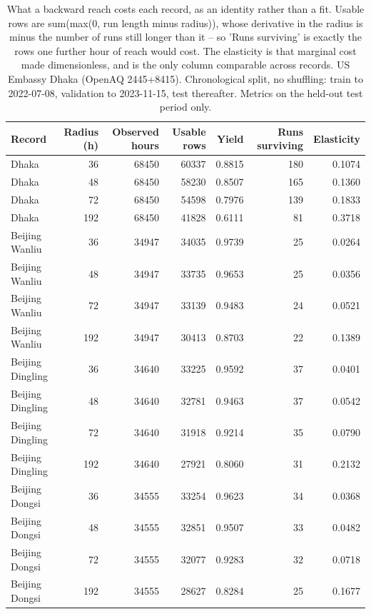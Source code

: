\begin{table}[htbp]
\caption{What a backward reach costs each record, as an identity rather than a fit. Usable rows are sum(max(0, run length minus radius)), whose derivative in the radius is minus the number of runs still longer than it -- so 'Runs surviving' is exactly the rows one further hour of reach would cost. The elasticity is that marginal cost made dimensionless, and is the only column comparable across records. US Embassy Dhaka (OpenAQ 2445+8415). Chronological split, no shuffling: train to 2022-07-08, validation to 2023-11-15, test thereafter. Metrics on the held-out test period only.}
\label{tab:decision_rule}
\begin{tabular}{lrrrrrr}
\toprule
Record & Radius (h) & Observed hours & Usable rows & Yield & Runs surviving & Elasticity \\
\midrule
Dhaka & 36 & 68450 & 60337 & 0.8815 & 180 & 0.1074 \\
Dhaka & 48 & 68450 & 58230 & 0.8507 & 165 & 0.1360 \\
Dhaka & 72 & 68450 & 54598 & 0.7976 & 139 & 0.1833 \\
Dhaka & 192 & 68450 & 41828 & 0.6111 & 81 & 0.3718 \\
Beijing Wanliu & 36 & 34947 & 34035 & 0.9739 & 25 & 0.0264 \\
Beijing Wanliu & 48 & 34947 & 33735 & 0.9653 & 25 & 0.0356 \\
Beijing Wanliu & 72 & 34947 & 33139 & 0.9483 & 24 & 0.0521 \\
Beijing Wanliu & 192 & 34947 & 30413 & 0.8703 & 22 & 0.1389 \\
Beijing Dingling & 36 & 34640 & 33225 & 0.9592 & 37 & 0.0401 \\
Beijing Dingling & 48 & 34640 & 32781 & 0.9463 & 37 & 0.0542 \\
Beijing Dingling & 72 & 34640 & 31918 & 0.9214 & 35 & 0.0790 \\
Beijing Dingling & 192 & 34640 & 27921 & 0.8060 & 31 & 0.2132 \\
Beijing Dongsi & 36 & 34555 & 33254 & 0.9623 & 34 & 0.0368 \\
Beijing Dongsi & 48 & 34555 & 32851 & 0.9507 & 33 & 0.0482 \\
Beijing Dongsi & 72 & 34555 & 32077 & 0.9283 & 32 & 0.0718 \\
Beijing Dongsi & 192 & 34555 & 28627 & 0.8284 & 25 & 0.1677 \\
\bottomrule
\end{tabular}
\end{table}
